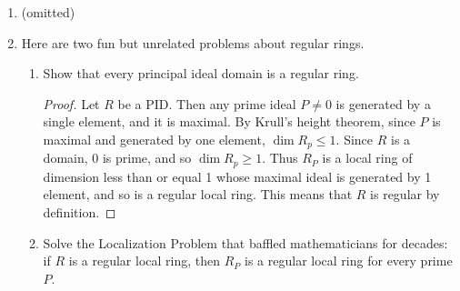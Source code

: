 \documentclass[11pt,oneside,english]{amsart}
\theoremstyle{definition}
\newcommand{\MF}[1]{\mathfrak{#1}}
\newcommand{\Ext}{\text{Ext}}
\begin{document}
\begin{enumerate}[leftmargin=*]
\begin{enumerate}
\begin{proof}
Suppose $r$ is regular on $M$ and $\Ext^i_R(M/rM,N) = 0$ for $i \gg 0$. Consider the short exact sequence
\[
\xymatrix{0 \ar[r] & M \ar[r]^{\cdot r} & M \ar[r] & R/rM \ar[r] & 0}
\]
Taking Hom's and looking at the resulting long exact sequence, we have
\[
\xymatrix{\cdots \ar[r] & \Ext_R^i(M/rM,N) \ar[r] & \Ext_R^i(M,N) \ar[r]^{\cdot r} & \Ext_R^i(M,N) \ar[r] & \Ext_R^{i+1}(M/rM,N) \ar[r] &\cdots}
\]
For $i$ large enough, we get
\[
\xymatrix{0 \ar[r] & \Ext_R^i(M,N) \ar[r]^{\cdot r} & \Ext_R^i(M,N) \ar[r] & 0}
\]
so $\cdot r$ is an iso. In particular it is surjective, so we have $r\Ext_R^i(M,N)=\Ext_R^i(M,N)$. Since $r$ is regular by hypothesis, $M/rM\neq 0$ and so $r$ is in some maximal ideal $\MF{m}$. Additionally, since $M$ and $N$ are finitely generated, so is $\Ext_R^i(M,N)$, and so by NAK (Proposition 4.30 on p. 53) we have $\Ext_R^i(M,N)=0$.
\end{proof}

\end{enumerate}

\item (omitted)

\item Here are two fun but unrelated problems about regular rings.
\begin{enumerate}
\item Show that every principal ideal domain is a regular ring.

\begin{proof}
Let $R$ be a PID. Then any prime ideal $P\neq0$ is generated by a single element, and it is maximal. By Krull's height theorem, since $P$ is maximal and generated by one element, $\dim R_p\leq 1$. Since $R$ is a domain, 0 is prime, and so $\dim R_p\geq 1$. Thus $R_P$ is a local ring of dimension less than or equal 1 whose maximal ideal is generated by 1 element, and so is a regular local ring. This means that $R$ is regular by definition.
\end{proof}

\item Solve the Localization Problem that baffled mathematicians for decades: if $R$ is a regular local ring, then $R_P$ is a regular local ring for every prime $P$.


\end{enumerate}
\end{enumerate}
\end{document}
